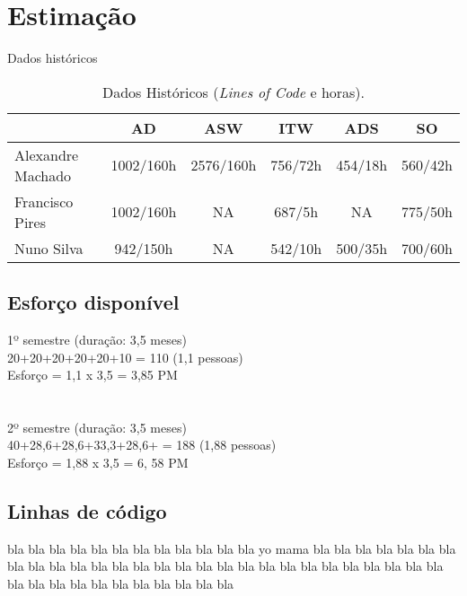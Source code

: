 \documentclass[12pt, a4paper, twoside]{report} %
\begin{document}
\clearpage

\section{Estimação}

Dados históricos

\begin{table}[h]
\centering
\begin{tabular}{|l|c c c c c|}
\hline
                  & AD        & ASW       & ITW     & ADS     & SO      \\ \hline
Alexandre Machado & 1002/160h & 2576/160h & 756/72h & 454/18h & 560/42h \\ \hline
Francisco Pires   & 1002/160h & NA        & 687/5h  & NA      & 775/50h \\ \hline
Nuno Silva        & 942/150h  & NA        & 542/10h & 500/35h & 700/60h\\ \hline
\end{tabular}
\caption{ Dados Históricos (\textit{Lines of Code} e horas).}
\label{my-label}
\end{table}

\subsection{Esforço disponível}
\begin{center}
1º semestre (duração: 3,5 meses)\\
20+20+20+20+20+10 = 110 (1,1 pessoas)\\
Esforço = 1,1 x 3,5 = 3,85 PM\\
\\
\\
2º semestre (duração: 3,5 meses)\\
40+28,6+28,6+33,3+28,6+ = 188 (1,88 pessoas)\\
Esforço = 1,88 x 3,5 = 6, 58 PM\\
\end{center}

\subsection{Linhas de código}

bla bla bla bla bla bla bla bla bla bla bla bla yo mama bla bla bla bla bla bla bla bla bla bla bla bla bla bla bla bla bla bla bla bla bla bla bla bla bla bla bla bla bla bla bla bla bla bla bla bla bla bla bla 
\end{document}
